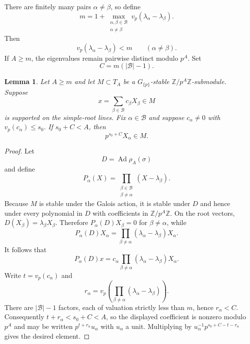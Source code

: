 \documentclass[11pt]{amsart}
\numberwithin{equation}{section}
\newcommand{\Z}{\mathbb Z}
\newcommand{\Ad}{\operatorname{Ad}}
\newtheorem{lemma}[theorem]{Lemma}
\theoremstyle{definition}
\begin{document}
There are finitely many pairs $\alpha\neq\beta$, so define
\begin{equation}\label{eq:m-separation}
 m=1+
 \max_{\substack{\alpha,\beta\in\mathcal B\\\alpha\neq\beta}}
 v_p(\lambda_\alpha-\lambda_\beta).
\end{equation}
Then
\begin{equation}\label{eq:lambda-separation}
 v_p(\lambda_\alpha-\lambda_\beta)<m
 \qquad(\alpha\neq\beta).
\end{equation}
If $A\ge m$, the eigenvalues remain pairwise distinct modulo $p^A$.
Set
\begin{equation}\label{eq:C-projector}
        C=m(|\mathcal B|-1).
\end{equation}

\begin{lemma}\label{lem:projector}
Let $A\ge m$ and let $M\subset T_A$ be a
$G_{\{p\}}$-stable $\Z/p^A\Z$-submodule. Suppose
\[
        x=\sum_{\beta\in\mathcal B}c_\beta X_\beta\in M
\]
is supported on the simple-root lines. Fix $\alpha\in\mathcal B$ and
suppose $c_\alpha\neq0$ with $v_p(c_\alpha)\le s_0$.  If
$s_0+C<A$, then
\[
        p^{s_0+C}X_\alpha\in M.
\]
\end{lemma}

\begin{proof}
Let
\[
        D=\Ad\rho_A(\sigma)
\]
and define
\[
        P_\alpha(X)=
        \prod_{\substack{\beta\in\mathcal B\\\beta\neq\alpha}}
        (X-\lambda_\beta).
\]
Because $M$ is stable under the Galois action, it is stable under $D$
and hence under every polynomial in $D$ with coefficients in
$\Z/p^A\Z$.  On the root vectors,
$D(X_\beta)=\lambda_\beta X_\beta$.  Therefore
$P_\alpha(D)X_\beta=0$ for $\beta\neq\alpha$, while
\[
 P_\alpha(D)X_\alpha
 =\prod_{\beta\neq\alpha}
   (\lambda_\alpha-\lambda_\beta)X_\alpha.
\]
It follows that
\[
 P_\alpha(D)x
 =c_\alpha
  \prod_{\beta\neq\alpha}
  (\lambda_\alpha-\lambda_\beta)X_\alpha.
\]
Write $t=v_p(c_\alpha)$ and
\[
 r_\alpha=
 v_p\!\left(
  \prod_{\beta\neq\alpha}
  (\lambda_\alpha-\lambda_\beta)
 \right).
\]
There are $|\mathcal B|-1$ factors, each of valuation strictly less
than $m$, hence $r_\alpha<C$.  Consequently
$t+r_\alpha<s_0+C<A$, so the displayed coefficient is nonzero modulo
$p^A$ and may be written
$p^{t+r_\alpha}u_\alpha$ with $u_\alpha$ a unit.  Multiplying by
$u_\alpha^{-1}p^{s_0+C-t-r_\alpha}$ gives the desired element.
\end{proof}
\end{document}
